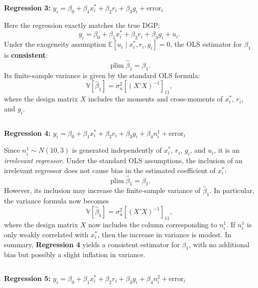 \documentclass[a4paper,12pt]{article} %
\theoremstyle{nonitalic}
\newenvironment{solution}[1]
  {\renewcommand\theinnercustomsol{#1}\innercustomsol}
  {\endinnercustomsol}
\newcounter{solutionctr}
\renewcommand{\thesolutionctr}{(\alph{solutionctr})}
\newenvironment{autosolution}
  {\stepcounter{solutionctr}\begin{solution}{\thesolutionctr}}
  {\end{solution}}
\begin{document}
\begin{autosolution}
\begin{lstlisting}[language=R]

\end{lstlisting}

\textbf{Regression 3:} $y_i = \beta_0 + \beta_1 x^*_i + \beta_2 r_i + \beta_3 g_i + \text{error}_i$

Here the regression exactly matches the true DGP:
\[
y_i=\beta_0+\beta_1x_i^*+\beta_2r_i+\beta_3g_i+u_i.
\]
Under the exogeneity assumption $\mathbb{E}[u_i\mid x_i^*,r_i,g_i]=0$, the OLS estimator for $\beta_1$ is \textbf{consistent}:
\[
\operatorname*{plim}\hat{\beta}_1=\beta_1.
\]
Its finite-sample variance is given by the standard OLS formula:
\[
\mathbb{V}[\hat{\beta}_1]=\sigma_u^2\left[(X'X)^{-1}\right]_{11},
\]
where the design matrix $X$ includes the moments and cross-moments of $x_i^*$, $r_i$, and $g_i$.

\begin{lstlisting}[language=R]

\end{lstlisting}

\textbf{Regression 4:} $y_i = \beta_0 + \beta_1 x^*_i + \beta_2 r_i + \beta_3 g_i + \beta_4 n_i^1 + \text{error}_i$

Since $n_i^1\sim N(10,3)$ is generated independently of $x_i^*$, $r_i$, $g_i$, and $u_i$, 
it is an \emph{irrelevant regressor}. 
Under the standard OLS assumptions, 
the inclusion of an irrelevant regressor does not 
cause bias in the estimated coefficient of $x_i^*$:
\[
\operatorname*{plim}\hat{\beta}_1 = \beta_1.
\]
However, its inclusion may increase the finite-sample variance of $\hat{\beta}_1$. 
In particular, the variance formula now becomes
\[
\mathbb{V}[\hat{\beta}_1] = \sigma_u^2\left[(X'X)^{-1}\right]_{11},
\]
where the design matrix $X$ now includes the column corresponding to $n_i^1$. 
If $n_i^1$ is only weakly correlated with $x_i^*$, 
then the increase in variance is modest. 
In summary, \textbf{Regression 4} yields a consistent estimator for $\beta_1$, with no additional bias but possibly a slight inflation in variance.


\begin{lstlisting}[language=R]

\end{lstlisting}

\textbf{Regression 5:} $y_i = \beta_0 + \beta_1 x^*_i + \beta_2 r_i + \beta_3 g_i + \beta_4 n_i^2 + \text{error}_i$


\end{autosolution}
\end{document}

